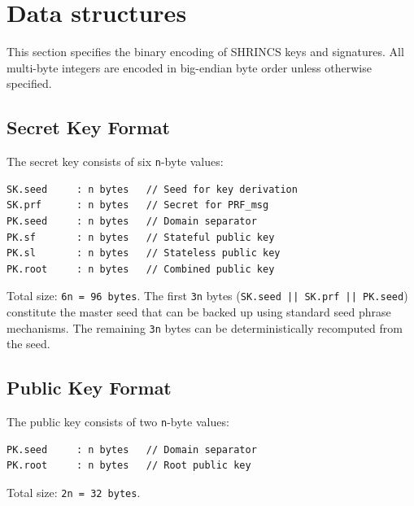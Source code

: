 \section{Data structures}

This section specifies the binary encoding of SHRINCS keys and signatures. All multi-byte integers are encoded in big-endian byte order unless otherwise specified.

\subsection{Secret Key Format}
The secret key consists of six \texttt{n}-byte values:
\begin{verbatim}
SK.seed     : n bytes   // Seed for key derivation
SK.prf      : n bytes   // Secret for PRF_msg
PK.seed     : n bytes   // Domain separator
PK.sf       : n bytes   // Stateful public key
PK.sl       : n bytes   // Stateless public key  
PK.root     : n bytes   // Combined public key
\end{verbatim}
Total size: \texttt{6n = 96 bytes}. The first \texttt{3n} bytes (\texttt{SK.seed || SK.prf || PK.seed}) constitute the master seed that can be backed up using standard seed phrase mechanisms. The remaining \texttt{3n} bytes can be deterministically recomputed from the seed.

\subsection{Public Key Format}
The public key consists of two \texttt{n}-byte values:
\begin{verbatim}
PK.seed     : n bytes   // Domain separator
PK.root     : n bytes   // Root public key
\end{verbatim}
Total size: \texttt{2n = 32 bytes}.

